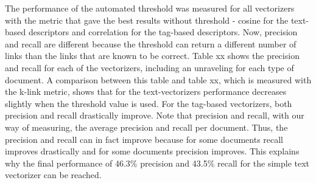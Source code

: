 The performance of the automated threshold was measured for all vectorizers with the metric that gave the best results without threshold - cosine for the text-based descriptors and correlation for the tag-based descriptors. Now, precision and recall are different because the threshold can return a different number of links than the links that are known to be correct. Table xx shows the precision and recall for each of the vectorizers, including an unraveling for each type of document. A comparison between this table and table xx, which is measured with the k-link metric, shows that for the text-vectorizers performance decreases slightly when the threshold value is used. %
For the tag-based vectorizers, both precision and recall drastically improve. Note that precision and recall, with our way of measuring, the average precision and recall per document. Thus, the precision and recall can in fact improve because for some documents recall improves drastically and for some documents precision improves. This explains why the final performance of 46.3\% precision and 43.5\% recall for the simple text vectorizer can be reached. %

